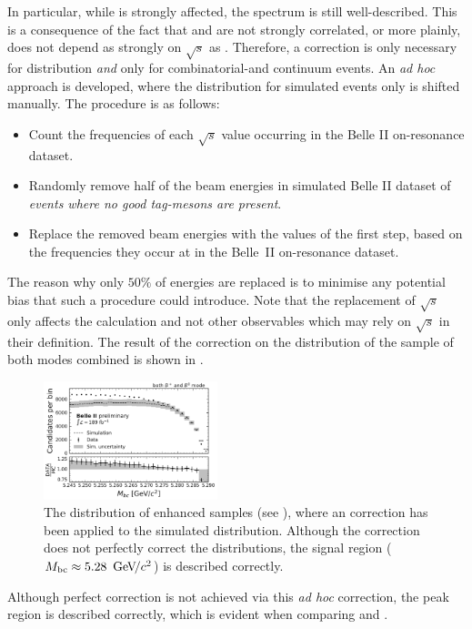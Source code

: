 In particular, while \Mbc is strongly affected, the \EB spectrum is still well-described.
This is a consequence of the fact that \EB and \Mbc are not strongly correlated, or more plainly, \EB does not depend as strongly on $\sqrt{s}$ as \Mbc.
Therefore, a correction is only necessary for \Mbc distribution \textit{and} only for combinatorial-\BB and continuum events.
An \textit{ad hoc} approach is developed, where the \Mbc distribution for simulated events only is shifted manually. 
The procedure is as follows:
\begin{itemize}
    \item Count the frequencies of each $\sqrt{s}$ value occurring in the Belle II on-resonance dataset.
    \item Randomly remove half of the beam energies in simulated Belle II dataset of \textit{events where no good tag-\B mesons are present}.
    \item Replace the removed beam energies with the values of the first step, based on the frequencies they occur at in the Belle~II on-resonance dataset.
\end{itemize}
The reason why only $50\%$ of energies are replaced is to minimise any potential bias that such a procedure could introduce.
Note that the replacement of $\sqrt{s}$ only affects the \Mbc calculation and not other observables which may rely on $\sqrt{s}$ in their definition.
The result of the correction on the \Mbc distribution of the sample of both \FEI modes combined is shown in .
\begin{figure}[htbp!]
    \centering
    \includegraphics[width=0.45\textwidth]{figures/data_validation/Bboth_qqbar_enhanced_mbccorrected.pdf}
    \caption{\label{fig:qqbar_enhanced_mbccorrected} The \Mbc distribution of \qqbar enhanced samples (see ),
    where an \Mbc correction has been applied to the simulated distribution.
    Although the correction does not perfectly correct the distributions, the signal region (${M_{\mathrm{bc}}}\approx5.28~{\mathrm{\,Ge\kern -0.1em V\!/}c^2}$) is described correctly.}
\end{figure}
Although perfect correction is not achieved via this \textit{ad hoc} correction, the peak region is described correctly, which is evident when comparing  and .

